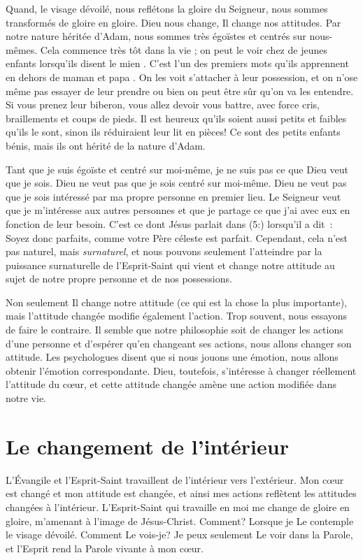 Quand, le visage dévoilé, nous reflétons la gloire du Seigneur,
 nous sommes transformés de gloire en gloire.
 Dieu nous change, Il change nos attitudes.
 Par notre nature héritée d'Adam, nous sommes très égoïstes
 et centrés sur nous-mêmes.
 Cela commence très tôt dans la vie ; on peut le voir chez de jeunes enfants
 lorsqu'ils disent \og le mien \fg{}.
 C'est l'un des premiers mots qu'ils apprennent
 en dehors de \og maman \fg{} et \og papa \fg{}.
 On les voit s'attacher à leur possession, et on n'ose même pas
 essayer de leur prendre ou bien on peut être sûr qu'on va les entendre.
 Si vous prenez leur biberon, vous allez devoir vous battre,
 avec force cris, braillements et coups de pieds.
 Il est heureux qu'ils soient aussi petits et faibles qu'ils le sont,
 sinon ils réduiraient leur lit en pièces!
 Ce sont des petits enfants bénis,
 mais ils ont hérité de la nature d'Adam.

Tant que je suis égoïste et centré sur moi-même,
 je ne suis pas ce que Dieu veut que je sois.
 Dieu ne veut pas que je sois centré sur moi-même.
 Dieu ne veut pas que je sois intéressé par ma propre personne
 en premier lieu.
 Le Seigneur veut que je m'intéresse aux autres personnes et que
 je partage ce que j'ai avec eux en fonction de leur besoin.
 C'est ce dont Jésus parlait dans (5:) lorsqu'il a dit~:
 \og Soyez donc parfaits, comme votre Père céleste est parfait. \fg{}
 Cependant, cela n'est pas naturel, mais \emph{surnaturel}, et nous pouvons seulement
 l'atteindre par la puissance surnaturelle de l'Esprit-Saint
 qui vient et change notre attitude au sujet de notre propre personne
 et de nos possessions.

Non seulement Il change notre attitude (ce qui est la chose la plus importante),
 mais l'attitude changée modifie également l'action.
 Trop souvent, nous essayons de faire le contraire.
 Il semble que notre philosophie soit de changer les actions d'une personne
 et d'espérer qu'en changeant ses actions, nous allons changer son attitude.
 Les psychologues disent que si nous jouons une émotion, nous allons obtenir
 l'émotion correspondante.
 Dieu, toutefois, s'intéresse à changer réellement l'attitude du cœur,
 et cette attitude changée amène une action modifiée dans notre vie.


\section*{Le changement de l'intérieur}

L'Évangile et l'Esprit-Saint travaillent de l'intérieur vers l'extérieur.
 Mon cœur est changé et mon attitude est changée,
 et ainsi mes actions reflètent les attitudes changées à l'intérieur.
 L'Esprit-Saint qui travaille en moi me change de gloire en gloire,
 m'amenant à l'image de Jésus-Christ. Comment?
 Lorsque je Le contemple le visage dévoilé.
 Comment Le vois-je? Je peux seulement Le voir dans la Parole,
 et l'Esprit rend la Parole vivante à mon cœur.

